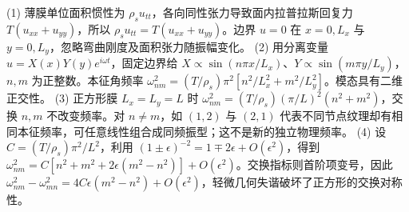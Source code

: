 (1) 薄膜单位面积惯性为 \(\rho_su_{tt}\)，各向同性张力导致面内拉普拉斯回复力 \(T(u_{xx}+u_{yy})\)，所以 \(\rho_su_{tt}=T(u_{xx}+u_{yy})\)。边界 \(u=0\) 在 \(x=0,L_x\) 与 \(y=0,L_y\)，忽略弯曲刚度及面积张力随振幅变化。
(2) 用分离变量 \(u=X(x)Y(y)e^{i\omega t}\)，固定边界给 \(X\propto\sin(n\pi x/L_x)\)、\(Y\propto\sin(m\pi y/L_y)\)，\(n,m\) 为正整数。本征角频率 \(\omega_{nm}^2=(T/\rho_s)\pi^2[n^2/L_x^2+m^2/L_y^2]\)。模态具有二维正交性。
(3) 正方形膜 \(L_x=L_y=L\) 时 \(\omega_{nm}^2=(T/\rho_s)(\pi/L)^2(n^2+m^2)\)，交换 \(n,m\) 不改变频率。对 \(n\ne m\)，如 \((1,2)\) 与 \((2,1)\) 代表不同节点纹理却有相同本征频率，可任意线性组合成同频振型；这不是新的独立物理频率。
(4) 设 \(C=(T/\rho_s)\pi^2/L^2\)，利用 \((1\pm\epsilon)^{-2}=1\mp2\epsilon+O(\epsilon^2)\)，得到 \(\omega_{nm}^2=C[n^2+m^2+2\epsilon(m^2-n^2)]+O(\epsilon^2)\)。交换指标则首阶项变号，因此 \(\omega_{nm}^2-\omega_{mn}^2=4C\epsilon(m^2-n^2)+O(\epsilon^2)\)，轻微几何失谐破坏了正方形的交换对称性。
